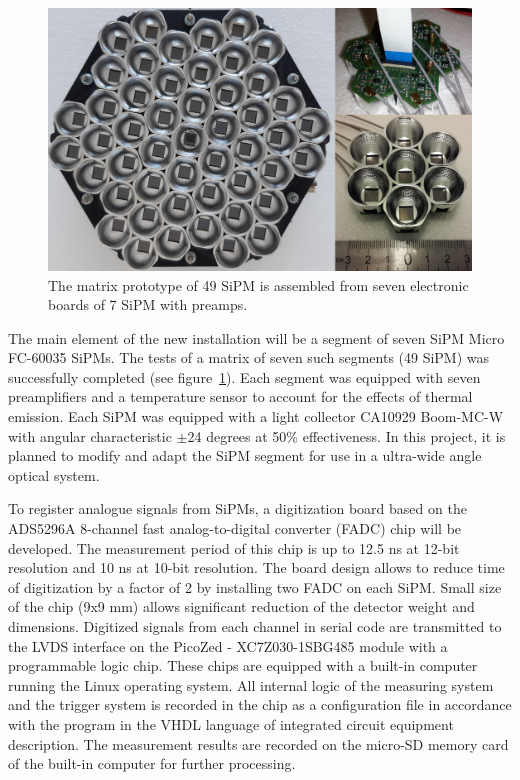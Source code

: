\documentclass[a4paper,11pt]{article}
\begin{document}
\begin{figure}[t]
\centering %
\includegraphics[width=.55\textwidth]{mosaic_protype.png}
\caption{The matrix prototype of 49 SiPM is assembled from seven electronic boards of 7 SiPM with preamps.}
\label{fig:mosaic49_7}
\end{figure}

The main element of the new installation will be a segment of seven SiPM Micro FC-60035 SiPMs. The tests of a matrix of seven such segments (49 SiPM) was successfully completed (see figure~\ref{fig:mosaic49_7}). Each segment was equipped with seven preamplifiers and a temperature sensor to account for the effects of thermal emission. Each SiPM was equipped with a light collector CA10929 Boom-MC-W with angular characteristic $\pm$24 degrees at 50\% effectiveness. In this project, it is planned to modify and adapt the SiPM segment for use in a ultra-wide angle optical system.

To register analogue signals from SiPMs, a digitization board based on the ADS5296A 8-channel fast analog-to-digital converter (FADC) chip will be developed.
The measurement period of this chip is up to 12.5 ns at 12-bit resolution and 10 ns at 10-bit resolution.
The board design allows to reduce time of digitization by a factor of 2 by installing two FADC on each SiPM.
Small size of the chip (9x9 mm) allows significant reduction of the detector weight and dimensions. 
Digitized signals from each channel in serial code are transmitted to the LVDS interface on the PicoZed - XC7Z030-1SBG485 module with a programmable logic chip.
These chips are equipped with a built-in computer running the Linux operating system.
All internal logic of the measuring system and the trigger system is recorded in the chip as a configuration file in accordance with the program in the VHDL language of integrated circuit equipment description.
The measurement results are recorded on the micro-SD memory card of the built-in computer for further processing.
\end{document}
